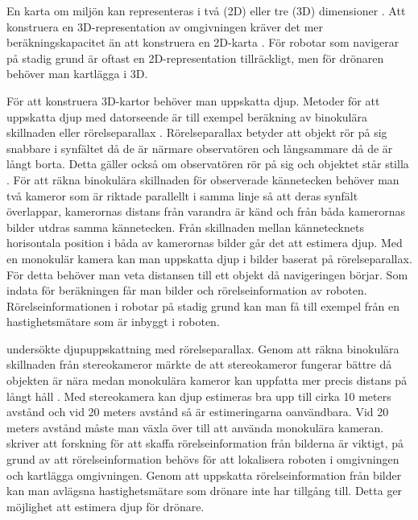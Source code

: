 En karta om miljön kan representeras i två (2D) eller tre (3D) dimensioner \citep{geospatial}. Att konstruera en 3D-representation av omgivningen kräver det mer beräkningskapacitet än att konstruera en 2D-karta \citep{ProbabilisticRobotics}. För robotar som navigerar på stadig grund är oftast en 2D-representation tillräckligt, men för drönaren behöver man kartlägga i 3D. 

För att konstruera 3D-kartor behöver man uppskatta djup. Metoder för att uppskatta djup med datorseende är till exempel beräkning av binokulära skillnaden eller rörelseparallax \citep{suomimainittu}. Rörelseparallax betyder att objekt rör på sig snabbare i synfältet då de är närmare observatören och långsammare då de är långt borta. Detta gäller också om observatören rör på sig och objektet står stilla \citep{suomimainittu, parallax}. För att räkna binokulära skillnaden för observerade kännetecken behöver man två kameror som är riktade parallellt i samma linje så att deras synfält överlappar, kamerornas distans från varandra är känd och från båda kamerornas bilder utdras samma kännetecken. Från skillnaden mellan kännetecknets horisontala position i båda av kamerornas bilder går det att estimera djup. Med en monokulär kamera kan man uppskatta djup i bilder baserat på rörelseparallax. För detta behöver man veta distansen till ett objekt då navigeringen börjar. Som indata för beräkningen får man bilder och rörelseinformation av roboten. Rörelseinformationen i robotar på stadig grund kan man få till exempel från en hastighetsmätare som är inbyggt i roboten.

\cite{suomimainittu} undersökte djupuppskattning med rörelseparallax. Genom att räkna binokulära skillnaden från stereokameror märkte de att stereokameror fungerar bättre då objekten är nära medan monokulära kameror kan uppfatta mer precis distans på långt håll \citep{suomimainittu}. Med stereokamera kan djup estimeras bra upp till cirka 10 meters avstånd och vid 20 meters avstånd så är estimeringarna oanvändbara. Vid 20 meters avstånd måste man växla över till att använda monokulära kameran. \cite{suomimainittu} skriver att forskning för att skaffa rörelseinformation från bilderna är viktigt, på grund av att rörelseinformation behövs för att lokalisera roboten i omgivningen och kartlägga omgivningen. Genom att uppskatta rörelseinformation från bilder kan man avlägsna hastighetsmätare som drönare inte har tillgång till. Detta ger möjlighet att estimera djup för drönare.

